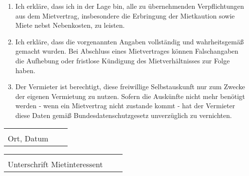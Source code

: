 \documentclass[a4paper]{scrartcl}
\begin{document}
\begin{Form}
\begin{enumerate}
\item Ich erkläre, dass ich in der Lage bin, alle zu übernehmenden
      Verpflichtungen aus dem Mietvertrag, insbesondere die Erbringung der
      Mietkaution sowie Miete nebst Nebenkosten, zu leisten.
\item Ich erkläre, dass die vorgenannten Angaben vollständig und wahrheitsgemäß
      gemacht wurden. Bei Abschluss eines Mietvertrages können Falschangaben
      die Aufhebung oder fristlose Kündigung des Mietverhältnisses zur Folge
      haben.
\item Der Vermieter ist berechtigt, diese freiwillige Selbstauskunft nur zum
      Zwecke der eigenen Vermietung zu nutzen. Sofern die Auskünfte nicht mehr
      benötigt werden ‐ wenn ein Mietvertrag nicht zustande kommt ‐ hat der
      Vermieter diese Daten gemäß Bundesdatenschutzgesetz unverzüglich zu
      vernichten.
\end{enumerate}
\vspace{1,2 cm} 
\begin{tabular}{p{7cm}p{.5cm}l}
\dotfill \\ 
Ort, Datum 
\end{tabular}%
\hfill 
\begin{tabular}{p{7cm}p{.5cm}l}
\dotfill \\ 
Unterschrift Mietinteressent
\end{tabular}%
\end{Form}
\end{document}

